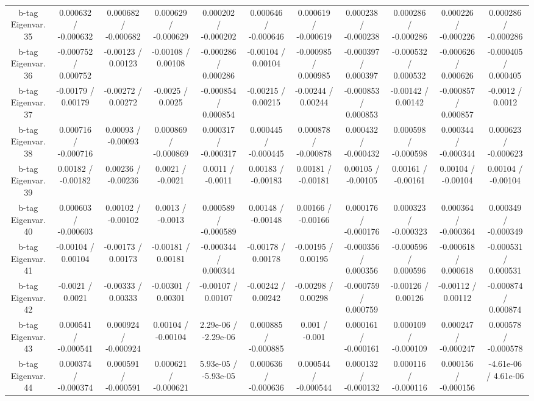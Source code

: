 \begin{table}[htbp]
\begin{center}
\begin{tabular}{|c|c|c|c|c|c|c|c|c|c|c|}
  b-tag Eigenvar. 35 & 0.000632 / -0.000632 & 0.000682 / -0.000682 & 0.000629 / -0.000629 & 0.000202 / -0.000202 & 0.000646 / -0.000646 & 0.000619 / -0.000619 & 0.000238 / -0.000238 & 0.000286 / -0.000286 & 0.000226 / -0.000226 & 0.000286 / -0.000286 \\ 
  b-tag Eigenvar. 36 & -0.000752 / 0.000752 & -0.00123 / 0.00123 & -0.00108 / 0.00108 & -0.000286 / 0.000286 & -0.00104 / 0.00104 & -0.000985 / 0.000985 & -0.000397 / 0.000397 & -0.000532 / 0.000532 & -0.000626 / 0.000626 & -0.000405 / 0.000405 \\ 
  b-tag Eigenvar. 37 & -0.00179 / 0.00179 & -0.00272 / 0.00272 & -0.0025 / 0.0025 & -0.000854 / 0.000854 & -0.00215 / 0.00215 & -0.00244 / 0.00244 & -0.000853 / 0.000853 & -0.00142 / 0.00142 & -0.000857 / 0.000857 & -0.0012 / 0.0012 \\ 
  b-tag Eigenvar. 38 & 0.000716 / -0.000716 & 0.00093 / -0.00093 & 0.000869 / -0.000869 & 0.000317 / -0.000317 & 0.000445 / -0.000445 & 0.000878 / -0.000878 & 0.000432 / -0.000432 & 0.000598 / -0.000598 & 0.000344 / -0.000344 & 0.000623 / -0.000623 \\ 
  b-tag Eigenvar. 39 & 0.00182 / -0.00182 & 0.00236 / -0.00236 & 0.0021 / -0.0021 & 0.0011 / -0.0011 & 0.00183 / -0.00183 & 0.00181 / -0.00181 & 0.00105 / -0.00105 & 0.00161 / -0.00161 & 0.00104 / -0.00104 & 0.00104 / -0.00104 \\ 
  b-tag Eigenvar. 40 & 0.000603 / -0.000603 & 0.00102 / -0.00102 & 0.0013 / -0.0013 & 0.000589 / -0.000589 & 0.00148 / -0.00148 & 0.00166 / -0.00166 & 0.000176 / -0.000176 & 0.000323 / -0.000323 & 0.000364 / -0.000364 & 0.000349 / -0.000349 \\ 
  b-tag Eigenvar. 41 & -0.00104 / 0.00104 & -0.00173 / 0.00173 & -0.00181 / 0.00181 & -0.000344 / 0.000344 & -0.00178 / 0.00178 & -0.00195 / 0.00195 & -0.000356 / 0.000356 & -0.000596 / 0.000596 & -0.000618 / 0.000618 & -0.000531 / 0.000531 \\ 
  b-tag Eigenvar. 42 & -0.0021 / 0.0021 & -0.00333 / 0.00333 & -0.00301 / 0.00301 & -0.00107 / 0.00107 & -0.00242 / 0.00242 & -0.00298 / 0.00298 & -0.000759 / 0.000759 & -0.00126 / 0.00126 & -0.00112 / 0.00112 & -0.000874 / 0.000874 \\ 
  b-tag Eigenvar. 43 & 0.000541 / -0.000541 & 0.000924 / -0.000924 & 0.00104 / -0.00104 & 2.29e-06 / -2.29e-06 & 0.000885 / -0.000885 & 0.001 / -0.001 & 0.000161 / -0.000161 & 0.000109 / -0.000109 & 0.000247 / -0.000247 & 0.000578 / -0.000578 \\ 
  b-tag Eigenvar. 44 & 0.000374 / -0.000374 & 0.000591 / -0.000591 & 0.000621 / -0.000621 & 5.93e-05 / -5.93e-05 & 0.000636 / -0.000636 & 0.000544 / -0.000544 & 0.000132 / -0.000132 & 0.000116 / -0.000116 & 0.000156 / -0.000156 & -4.61e-06 / 4.61e-06 \\ 

\end{tabular}
\end{center}
\end{table}
